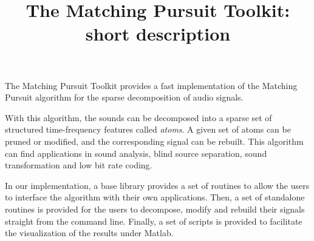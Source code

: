 \documentclass[11pt,a4paper]{article}
\title{The Matching Pursuit Toolkit: \\ short description}
\begin{document}
\maketitle

\noindent The Matching Pursuit Toolkit provides a fast implementation of the Matching
Pursuit algorithm for the sparse decomposition of audio signals.

With this algorithm, the sounds can be decomposed into a sparse set of
structured time-frequency features called {\em atoms}. A given set of atoms can
be pruned or modified, and the corresponding signal can be rebuilt. This
algorithm can find applications in sound analysis, blind source separation,
sound transformation and low bit rate coding.

In our implementation, a base library provides a set of routines to allow the
users to interface the algorithm with their own applications. Then, a set of
standalone routines is provided for the users to decompose, modify and rebuild
their signals straight from the command line. Finally, a set of scripts is
provided to facilitate the visualization of the results under Matlab.
\end{document}
